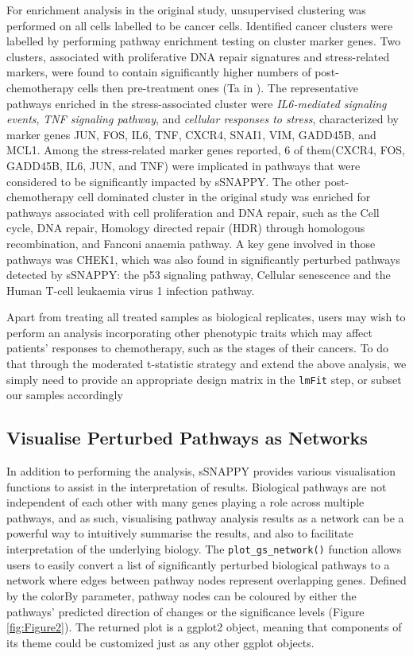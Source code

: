 \documentclass[9pt,a4paper,]{extarticle}
\begin{document}
For enrichment analysis in the original study\citep{Zhang2022}, unsupervised clustering was performed on all cells labelled to be cancer cells.
Identified cancer clusters were labelled by performing pathway enrichment testing on cluster marker genes.
Two clusters, associated with proliferative DNA repair signatures and stress-related markers, were found to contain significantly higher numbers of post-chemotherapy cells then pre-treatment ones (Ta in \citep{Zhang2022}).
The representative pathways enriched in the stress-associated cluster were \emph{IL6-mediated signaling events}, \emph{TNF signaling pathway}, and \emph{cellular responses to stress}, characterized by marker genes JUN, FOS, IL6, TNF, CXCR4, SNAI1, VIM, GADD45B, and MCL1.
Among the stress-related marker genes reported, 6 of them(CXCR4, FOS, GADD45B, IL6, JUN, and TNF) were implicated in pathways that were considered to be significantly impacted by sSNAPPY.
The other post-chemotherapy cell dominated cluster in the original study was enriched for pathways associated with cell proliferation and DNA repair, such as the Cell cycle, DNA repair, Homology directed repair (HDR) through homologous recombination, and Fanconi anaemia pathway.
A key gene involved in those pathways was CHEK1, which was also found in significantly perturbed pathways detected by sSNAPPY: the p53 signaling pathway, Cellular senescence and the Human T-cell leukaemia virus 1 infection pathway.

Apart from treating all treated samples as biological replicates, users may wish to perform an analysis incorporating other phenotypic traits which may affect patients' responses to chemotherapy, such as the stages of their cancers.
To do that through the moderated t-statistic strategy and extend the above analysis, we simply need to provide an appropriate design matrix in the \texttt{lmFit} step, or subset our samples accordingly

\hypertarget{visualise-perturbed-pathways-as-networks}{%
\subsection{Visualise Perturbed Pathways as Networks}\label{visualise-perturbed-pathways-as-networks}}

In addition to performing the analysis, sSNAPPY provides various visualisation functions to assist in the interpretation of results.
Biological pathways are not independent of each other with many genes playing a role across multiple pathways, and as such, visualising pathway analysis results as a network can be a powerful way to intuitively summarise the results, and also to facilitate interpretation of the underlying biology.
The \texttt{plot\_gs\_network()} function allows users to easily convert a list of significantly perturbed biological pathways to a network where edges between pathway nodes represent overlapping genes.
Defined by the colorBy parameter, pathway nodes can be coloured by either the pathways' predicted direction of changes or the significance levels (Figure \ref{fig:Figure2}).
The returned plot is a ggplot2 \citep{Wickham2009} object, meaning that components of its theme could be customized just as any other ggplot objects.
\end{document}
